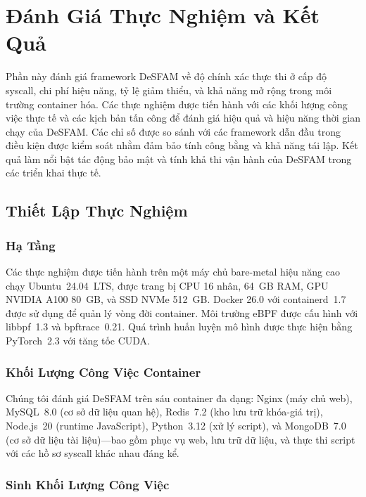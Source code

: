 \section{Đánh Giá Thực Nghiệm và Kết Quả}
\label{sec:evaluation}

Phần này đánh giá framework DeSFAM về độ chính xác thực thi ở cấp độ syscall,
chi phí hiệu năng, tỷ lệ giảm thiểu, và khả năng mở rộng trong môi trường container hóa.
Các thực nghiệm được tiến hành với các khối lượng công việc thực tế và các kịch bản tấn công
để đánh giá hiệu quả và hiệu năng thời gian chạy của DeSFAM. Các chỉ số được so sánh với các
framework dẫn đầu trong điều kiện được kiểm soát nhằm đảm bảo tính công bằng và khả năng tái
lập. Kết quả làm nổi bật tác động bảo mật và tính khả thi vận hành của DeSFAM trong các triển
khai thực tế.

\subsection{Thiết Lập Thực Nghiệm}
\label{subsec:experimental_setup}

\subsubsection{Hạ Tầng}
\label{subsubsec:infrastructure}

Các thực nghiệm được tiến hành trên một máy chủ bare-metal hiệu năng cao chạy Ubuntu~24.04~LTS,
được trang bị CPU 16 nhân, 64~GB RAM, GPU NVIDIA A100 80~GB, và SSD NVMe 512~GB. Docker
26.0 với containerd~1.7 được sử dụng để quản lý vòng đời container. Môi trường eBPF được
cấu hình với libbpf~1.3 và bpftrace~0.21. Quá trình huấn luyện mô hình được thực hiện bằng
PyTorch~2.3 với tăng tốc CUDA.

\subsubsection{Khối Lượng Công Việc Container}
\label{subsubsec:container_workloads}

Chúng tôi đánh giá DeSFAM trên sáu container đa dạng: Nginx (máy chủ web), MySQL~8.0 (cơ sở
dữ liệu quan hệ), Redis~7.2 (kho lưu trữ khóa-giá trị), Node.js~20 (runtime JavaScript),
Python~3.12 (xử lý script), và MongoDB~7.0 (cơ sở dữ liệu tài liệu)---bao gồm phục vụ web,
lưu trữ dữ liệu, và thực thi script với các hồ sơ syscall khác nhau đáng kể.

\subsubsection{Sinh Khối Lượng Công Việc}
\label{subsubsec:workload_generation}


